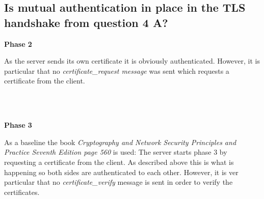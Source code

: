 \documentclass{report}
\begin{document}
		\subsection{Is mutual authentication in place in the TLS handshake from question 4 A?}
		\startsubsection
			\parbox{2cm}{\textbf{Phase 2}\dotfill} \parbox[t]{12.5cm}{As the server sends its own certificate it is obviously authenticated. However, it is particular that no \textit{certificate\_request message} was sent which requests a certificate from the client.} \\
			\\\parbox{2cm}{\textbf{Phase 3}\dotfill} \parbox[t]{12.5cm}{As a baseline the book \textit{Cryptography and Network Security Principles and Practice Seventh Edition page 560} is used: The server starts phase 3 by requesting a certificate from the client. As described above this is what is happening so both sides are authenticated to each other. However, it is ver particular that no \textit{certificate\_verify} message is sent in order to verify the certificates.} \\
		\closesection
	\closesection
\end{document}
